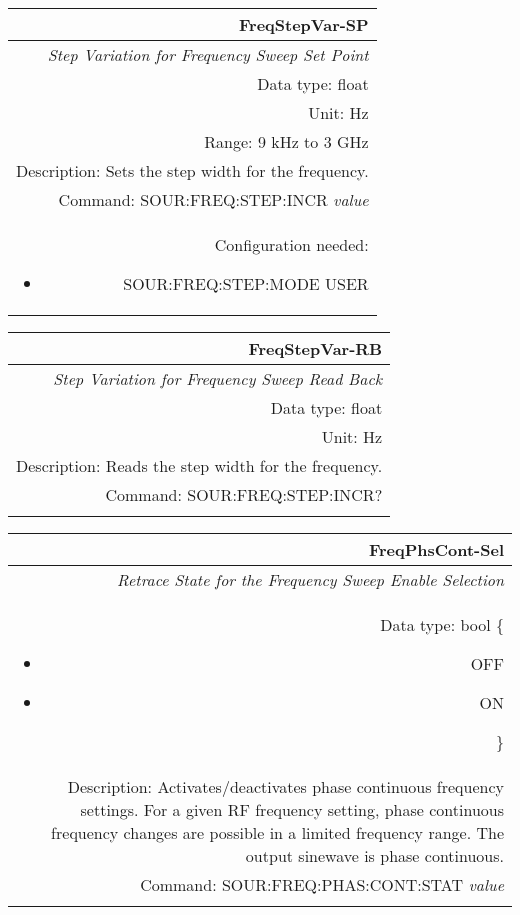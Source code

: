 \documentclass[openany]{article}
\begin{document}
		\begin{tabular}{N}
			\hline
			\bfseries FreqStepVar-SP \\ \hline
			\emph{Step Variation for Frequency Sweep Set Point} \\
			Data type: float \\
			Unit: Hz \\
			Range: 9 kHz to 3 GHz \\
			Description: Sets the step width for the frequency.\\
			Command: SOUR:FREQ:STEP:INCR \emph{value} \\
			Configuration needed: \begin{itemize}[noitemsep]
                                 \small
                                 \item[] SOUR:FREQ:STEP:MODE USER
                         \end{itemize} \\
			
		\end{tabular}


		\begin{tabular}{N}
			\hline
			\bfseries FreqStepVar-RB \\ \hline
			\emph{Step Variation for Frequency Sweep Read Back} \\
			Data type: float \\
			Unit: Hz \\
			Description: Reads the step width for the frequency. \\
			Command: SOUR:FREQ:STEP:INCR? \\
			\\

		\end{tabular}


		\begin{tabular}{N}
			\hline
			\bfseries FreqPhsCont-Sel \\ \hline
			\emph{Retrace State for the Frequency Sweep Enable Selection} \\
			Data type: bool \{\begin{itemize}[noitemsep]
				\small
				\item[] OFF
				\item[] ON
			\end{itemize}\} \\
			Description: Activates/deactivates phase continuous frequency settings. For a given RF frequency setting, phase continuous frequency changes are possible in a limited frequency range. The output sinewave is phase continuous. \\
			Command: SOUR:FREQ:PHAS:CONT:STAT \emph{value} \\
			\\

		\end{tabular}
\end{document}
